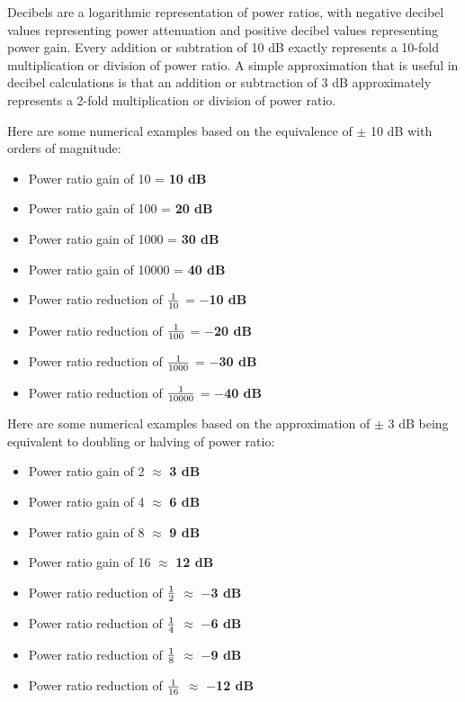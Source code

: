 

Decibels are a logarithmic representation of power ratios, with negative decibel values representing power attenuation and positive decibel values representing power gain.  Every addition or subtration of 10 dB exactly represents a 10-fold multiplication or division of power ratio.  A simple approximation that is useful in decibel calculations is that an addition or subtraction of 3 dB approximately represents a 2-fold multiplication or division of power ratio.

\vskip 10pt

Here are some numerical examples based on the equivalence of $\pm$ 10 dB with orders of magnitude:

\begin{itemize}
\item{} Power ratio gain of 10 = {\bf 10 dB}
\vskip 3pt
\item{} Power ratio gain of 100 = {\bf 20 dB}
\vskip 3pt
\item{} Power ratio gain of 1000 = {\bf 30 dB}
\vskip 3pt
\item{} Power ratio gain of 10000 = {\bf 40 dB}
\vskip 3pt
\item{} Power ratio reduction of $1 \over 10$ = {\bf $-$10 dB}
\vskip 3pt
\item{} Power ratio reduction of $1 \over 100$ = {\bf $-$20 dB}
\vskip 3pt
\item{} Power ratio reduction of $1 \over 1000$ = {\bf $-$30 dB}
\vskip 3pt
\item{} Power ratio reduction of $1 \over 10000$ = {\bf $-$40 dB}
\end{itemize}

\vskip 10pt

Here are some numerical examples based on the approximation of $\pm$ 3 dB being equivalent to doubling or halving of power ratio:

\begin{itemize}
\item{} Power ratio gain of 2 $\approx$ {\bf 3 dB}
\vskip 3pt
\item{} Power ratio gain of 4 $\approx$ {\bf 6 dB}
\vskip 3pt
\item{} Power ratio gain of 8 $\approx$ {\bf 9 dB}
\vskip 3pt
\item{} Power ratio gain of 16 $\approx$ {\bf 12 dB}
\vskip 3pt
\item{} Power ratio reduction of $1 \over 2$ $\approx$ {\bf $-$3 dB}
\vskip 3pt
\item{} Power ratio reduction of $1 \over 4$ $\approx$ {\bf $-$6 dB}
\vskip 3pt
\item{} Power ratio reduction of $1 \over 8$ $\approx$ {\bf $-$9 dB}
\vskip 3pt
\item{} Power ratio reduction of $1 \over 16$ $\approx$ {\bf $-$12 dB}
\end{itemize}

